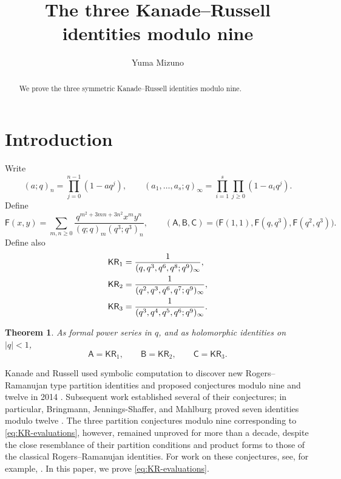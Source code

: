 \documentclass[11pt]{article}
\title{The three Kanade--Russell identities modulo nine}
\author{Yuma Mizuno}
\date{}
\numberwithin{equation}{section}
\newtheorem{theorem}{Theorem}[section]
\theoremstyle{remark}
\newcommand{\KR}{\mathsf{KR}}
\begin{document}
\maketitle
\begin{abstract}
We prove the three symmetric Kanade--Russell identities modulo nine.
\end{abstract}

\section{Introduction}

Write
\[
 (a;q)_n=\prod_{j=0}^{n-1}(1-aq^j),\qquad
 (a_1,\ldots,a_s;q)_\infty=\prod_{i=1}^s\prod_{j\geq0}(1-a_iq^j).
\]
Define
\begin{equation}\label{eq:source-definition}
 \mathsf F(x,y)=\sum_{m,n\geq0}
 \frac{q^{m^2+3mn+3n^2}x^my^n}{(q;q)_m(q^3;q^3)_n},\qquad
 (\mathsf A,\mathsf B,\mathsf C)
 =\bigl(\mathsf F(1,1),\mathsf F(q,q^3),\mathsf F(q^2,q^3)\bigr).
\end{equation}
Define also
\begin{align}
 \KR_1&=\frac1{(q,q^3,q^6,q^8;q^9)_\infty},\notag\\
 \KR_2&=\frac1{(q^2,q^3,q^6,q^7;q^9)_\infty},\label{eq:K-products}\\
 \KR_3&=\frac1{(q^3,q^4,q^5,q^6;q^9)_\infty}.\notag
\end{align}

\begin{theorem}\label{thm:KR-evaluations}
As formal power series in \(q\), and as holomorphic identities on
\(|q|<1\),
\begin{equation}\label{eq:KR-evaluations}
 \mathsf A=\KR_1,\qquad \mathsf B=\KR_2,\qquad \mathsf C=\KR_3.
\end{equation}
\end{theorem}

Kanade and Russell used symbolic computation to discover new
Rogers--Ramanujan type partition identities and proposed conjectures
modulo nine and twelve in 2014 \cite{KanadeRussell2015}.
Subsequent work established several of their conjectures; in particular,
Bringmann, Jennings-Shaffer, and Mahlburg proved seven identities modulo
twelve \cite{BringmannJenningsShafferMahlburg2020}.
The three partition conjectures modulo nine corresponding to
\eqref{eq:KR-evaluations}, however,
remained unproved for more than a decade, despite the close resemblance
of their partition conditions and product forms to those of the classical
Rogers--Ramanujan identities.
For work on these conjectures, see, for example,
\cite{KanadeRussell2019,Kursungoz2019,ChernLi2020,Chern2020,
UncuZudilin2021,Konenkov2024,Tsuchioka2022,Mizuno2025,WangZhang2025}.
In this paper, we prove \eqref{eq:KR-evaluations}.
\end{document}
